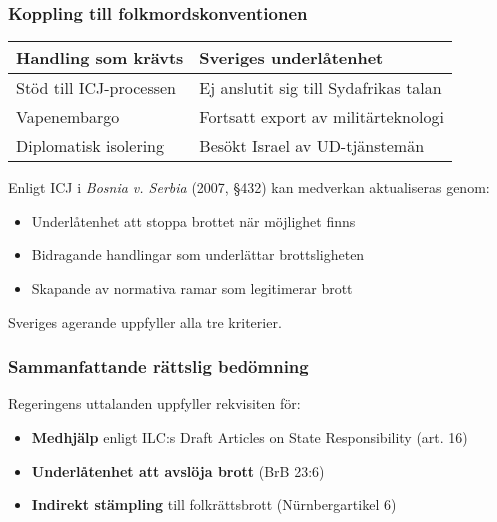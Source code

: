 \subsubsection{Koppling till folkmordskonventionen}

\begin{tabular}{p{}p{}}
\textbf{Handling som krävts} & \textbf{Sveriges underlåtenhet} \\
\hline
Stöd till ICJ-processen & Ej anslutit sig till Sydafrikas talan \\
\hline
Vapenembargo & Fortsatt export av militärteknologi \\
\hline
Diplomatisk isolering & Besökt Israel av UD-tjänstemän \\
\end{tabular}



Enligt ICJ i \textit{Bosnia v. Serbia} (2007, §432) kan medverkan aktualiseras genom:
\begin{itemize}
\item Underlåtenhet att stoppa brottet när möjlighet finns
\item Bidragande handlingar som underlättar brottsligheten
\item Skapande av normativa ramar som legitimerar brott
\end{itemize}
Sveriges agerande uppfyller alla tre kriterier.



\subsubsection{Sammanfattande rättslig bedömning}
Regeringens uttalanden uppfyller rekvisiten för:
\begin{itemize}
\item \textbf{Medhjälp} enligt ILC:s Draft Articles on State Responsibility (art. 16)
\item \textbf{Underlåtenhet att avslöja brott} (BrB 23:6)
\item \textbf{Indirekt stämpling} till folkrättsbrott (Nürnbergartikel 6)
\end{itemize}